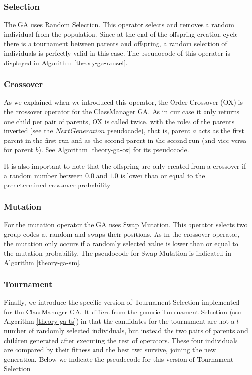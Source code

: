 \subsubsection{Selection}

The GA uses Random Selection. This operator selects and removes a random individual from the population. Since at the end of the offspring creation cycle there is a tournament between parents and offspring, a random selection of individuals is perfectly valid in this case. The pseudocode of this operator is displayed in Algorithm \ref{theory-ga-ransel}.


\subsubsection{Crossover}

As we explained when we introduced this operator, the Order Crossover (OX) is the crossover operator for the ClassManager GA. As in our case it only returns one child per pair of parents, OX is called twice, with the roles of the parents inverted (see the $NextGeneration$ pseudocode), that is, parent $a$ acts as the first parent in the first run and as the second parent in the second run (and vice versa for parent $b$). See Algorithm \ref{theory-ga-ox} for its pseudocode.

It is also important to note that the offspring are only created from a crossover if a random number between $0.0$ and $1.0$ is lower than or equal to the predetermined crossover probability.


\subsubsection{Mutation}

For the mutation operator the GA uses Swap Mutation. This operator selects two group codes at random and swaps their positions. As in the crossover operator, the mutation only occurs if a randomly selected value is lower than or equal to the mutation probability. The pseudocode for Swap Mutation is indicated in Algorithm \ref{theory-ga-sm}.   


\subsubsection{Tournament}

Finally, we introduce the specific version of Tournament Selection implemented for the ClassManager GA. It differs from the generic Tournament Selection (see Algorithm \ref{theory-ga-ts}) in that the candidates for the tournament are not a $t$ number of randomly selected individuals, but instead the two pairs of parents and children generated after executing the rest of operators. These four individuals are compared by their fitness and the best two survive, joining the new generation. Below we indicate the pseudocode for this version of Tournament Selection.

